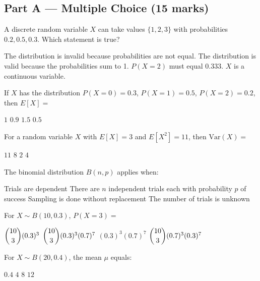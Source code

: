 \documentclass[addpoints]{exam}
\begin{document}
\newpage
\begin{questions}

\section*{Part A --- Multiple Choice (15 marks)}
\vspace{5mm}

\question[1] A discrete random variable $X$ can take values $\{1, 2, 3\}$ with probabilities
$0.2, 0.5, 0.3$. Which statement is true?
\begin{choices}
    \choice The distribution is invalid because probabilities are not equal.
    \correctchoice The distribution is valid because the probabilities sum to 1.
    \choice $P(X=2)$ must equal $0.333$.
    \choice $X$ is a continuous variable.
\end{choices}

\question[1] If $X$ has the distribution $P(X=0)=0.3$, $P(X=1)=0.5$, $P(X=2)=0.2$,
then $E[X] =$
\begin{choices}
    \choice $1$
    \correctchoice $0.9$
    \choice $1.5$
    \choice $0.5$
\end{choices}

\question[1] For a random variable $X$ with $E[X]=3$ and $E[X^2]=11$, then $\text{Var}(X) =$
\begin{choices}
    \choice $11$
    \choice $8$
    \correctchoice $2$
    \choice $4$
\end{choices}

\question[1] The binomial distribution $B(n,p)$ applies when:
\begin{choices}
    \choice Trials are dependent
    \correctchoice There are $n$ independent trials each with probability $p$ of success
    \choice Sampling is done without replacement
    \choice The number of trials is unknown
\end{choices}

\question[1] For $X \sim B(10, 0.3)$, $P(X = 3) =$
\begin{choices}
    \choice $\dbinom{10}{3}(0.3)^3$
    \correctchoice $\dbinom{10}{3}(0.3)^3(0.7)^7$
    \choice $(0.3)^3(0.7)^7$
    \choice $\dbinom{10}{3}(0.7)^3(0.3)^7$
\end{choices}

\question[1] For $X \sim B(20, 0.4)$, the mean $\mu$ equals:
\begin{choices}
    \choice $0.4$
    \choice $4$
    \correctchoice $8$
    \choice $12$
\end{choices}


\end{questions}
\end{document}
